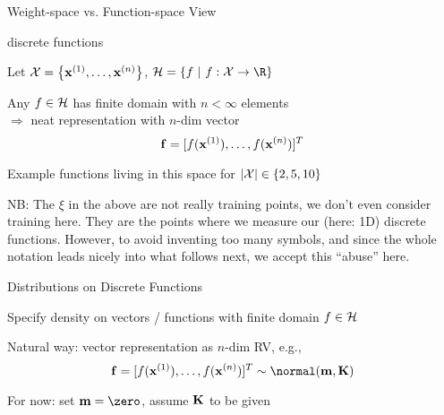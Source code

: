 \documentclass[11pt,compress,t,notes=noshow, xcolor=table]{beamer}
\begin{document}
\begin{frame2}{Weight-space vs. Function-space View}
\end{frame2}

\begin{framei}{discrete functions}
\item Let $\mathcal{X} = \left\{ \mathbf{x}^{(1)}, \ldots, \mathbf{x}^{(n)}\right\}$, $\Hspace = \{f ~|~ f: \Xspace \rightarrow \R\}$
\item Any $f \in \mathcal{H}$ has finite domain with $n < \infty$ elements \\$\Rightarrow$ neat representation with $n$-dim vector 
$$\mathbf{f} = [f(\mathbf{x}^{(1)}), \dots, f(\mathbf{x}^{(n)})]^T$$
\item Example functions living in this space for $|\mathcal{X}| \in \{2, 5, 10\}$
\vfill
{}

\item \footnotesize{NB: The $\xi$ in the above are not really training points, we don't even consider training here. They are the points where we measure our (here: 1D) discrete functions. However, to avoid inventing too many symbols, and since the whole notation leads nicely into what follows next, we accept this ``abuse'' here.}  

\end{framei}

\begin{framei}[sep=L]{Distributions on Discrete Functions}
\item Specify density on vectors / functions with finite domain $f \in \mathcal{H}$ 
\item Natural way: vector representation as $n$-dim RV, e.g.,
$$\fv = \fvec^T \sim \Nmk$$
\item For now: set $\mv = \zero$, assume $\mathbf{K}$ to be given
\end{framei}
\end{document}
